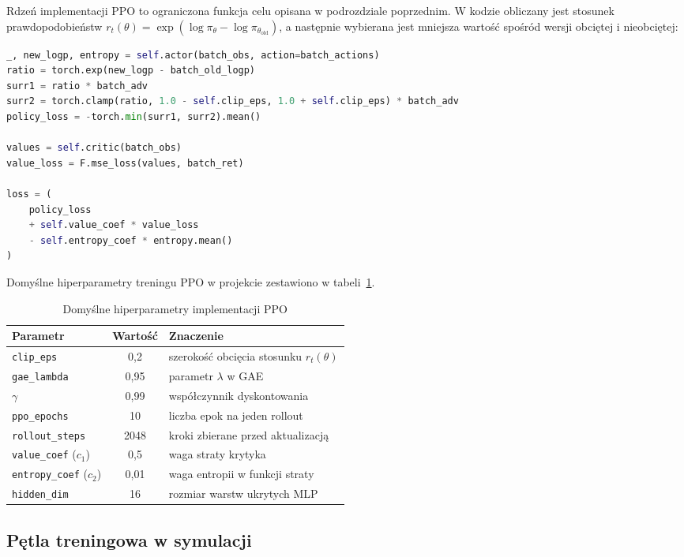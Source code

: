\documentclass[12pt,twoside]{article}
\begin{document}
Rdzeń implementacji PPO to ograniczona funkcja celu opisana w podrozdziale poprzednim. W kodzie obliczany jest stosunek prawdopodobieństw $r_t(\theta) = \exp(\log\pi_\theta - \log\pi_{\theta_{\text{old}}})$, a następnie wybierana jest mniejsza wartość spośród wersji obciętej i nieobciętej:

\begin{lstlisting}[language=Python, caption=Aktualizacja wag PPO (clipping + krytyk + entropia), label=listPPO2]
_, new_logp, entropy = self.actor(batch_obs, action=batch_actions)
ratio = torch.exp(new_logp - batch_old_logp)
surr1 = ratio * batch_adv
surr2 = torch.clamp(ratio, 1.0 - self.clip_eps, 1.0 + self.clip_eps) * batch_adv
policy_loss = -torch.min(surr1, surr2).mean()

values = self.critic(batch_obs)
value_loss = F.mse_loss(values, batch_ret)

loss = (
    policy_loss
    + self.value_coef * value_loss
    - self.entropy_coef * entropy.mean()
)
\end{lstlisting}

Domyślne hiperparametry treningu PPO w projekcie zestawiono w tabeli~\ref{tab:ppo_hparams}.

\begin{table}[H]
\centering
\renewcommand{\arraystretch}{1.2}
\begin{tabular}{|l|c|l|}
\hline
\textbf{Parametr} & \textbf{Wartość} & \textbf{Znaczenie} \\
\hline
\texttt{clip\_eps} & 0,2 & szerokość obcięcia stosunku $r_t(\theta)$ \\
\texttt{gae\_lambda} & 0,95 & parametr $\lambda$ w GAE \\
$\gamma$ & 0,99 & współczynnik dyskontowania \\
\texttt{ppo\_epochs} & 10 & liczba epok na jeden rollout \\
\texttt{rollout\_steps} & 2048 & kroki zbierane przed aktualizacją \\
\texttt{value\_coef} ($c_1$) & 0,5 & waga straty krytyka \\
\texttt{entropy\_coef} ($c_2$) & 0,01 & waga entropii w funkcji straty \\
\texttt{hidden\_dim} & 16 & rozmiar warstw ukrytych MLP \\
\hline
\end{tabular}
\caption{Domyślne hiperparametry implementacji PPO}
\label{tab:ppo_hparams}
\end{table}

\subsection{Pętla treningowa w symulacji}
\end{document}

